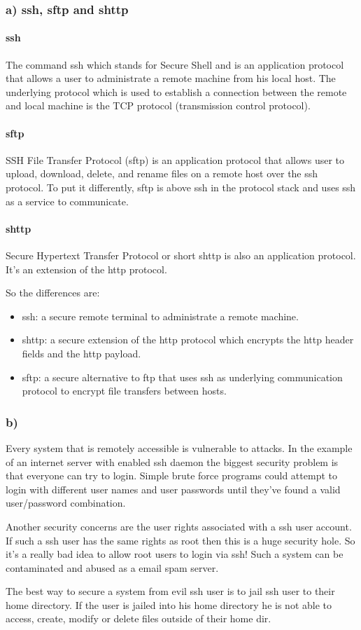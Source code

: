 \documentclass[12pt]{article}
\begin{document}
\subsubsection*{a) ssh, sftp and shttp}
\paragraph{ssh}
The command ssh which stands for Secure Shell and is an application protocol that allows a user to administrate a remote machine from his local host. The underlying protocol which is used to establish a connection between the remote and local machine is the TCP protocol (transmission control protocol).
 
\paragraph{sftp}
SSH File Transfer Protocol (sftp) is an application protocol that allows  user to upload, download, delete, and rename files on a remote host over the ssh protocol. To put it differently, sftp is above ssh in the protocol stack and uses ssh as a service to communicate.

\paragraph{shttp}
Secure Hypertext Transfer Protocol or short shttp is also an application protocol. It's an extension of the http protocol.

So the differences are:
\begin{itemize}
\item ssh: a secure remote terminal to administrate a remote machine.
\item shttp: a secure extension of the http protocol which encrypts the http header fields and the http payload.
\item sftp: a secure alternative to ftp that uses ssh as underlying communication protocol to encrypt file transfers between hosts.
\end{itemize}

\subsubsection*{b)}
Every system that is remotely accessible is vulnerable to attacks. In the example of an internet server with enabled ssh daemon the biggest security problem is that everyone can try to login. Simple brute force programs could attempt to login with different user names and user passwords until they've found a valid user/password combination.

Another security concerns are the user rights associated with a ssh user account. If such a ssh user has the same rights as root then this is a huge security hole. So it's a really bad idea to allow root users to login via ssh! Such a system can be contaminated and abused as a email spam server.

The best way to secure a system from evil ssh user is to jail ssh user to their home directory. If the user is jailed into his home directory he is not able to access, create, modify or delete files outside of their home dir.
 
\end{document}
